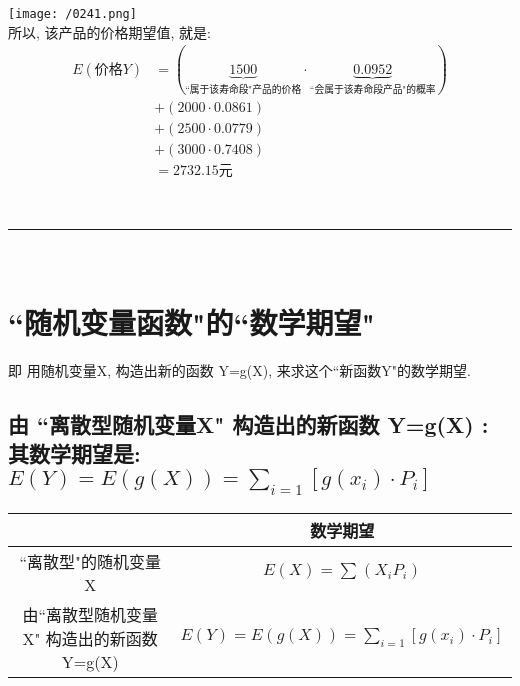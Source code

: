 \documentclass[UTF8]{ctexart}
\begin{document}
\begin{myEnvSample}
\texttt{[image: /0241.png]} \\

所以, 该产品的价格期望值, 就是: \\
\begin{align*}  %
	E(\text{价格}Y) & =\left( \underset{\text{``属于该寿命段"产品的价格}}{\underbrace{1500}}\cdot \underset{\text{``会属于该寿命段产品"的概率}}{\underbrace{0.0952}} \right)\\
& +\left( 2000\cdot 0.0861 \right)\\
& +\left( 2500\cdot 0.0779 \right)\\
& +\left( 3000\cdot 0.7408 \right)\\
& =2732.15 \text{元}
\end{align*}
\end{myEnvSample}
	
	
	
	~\\
	\hrule
	~\\
	
	
\section{``随机变量函数"的``数学期望"}	
即 用随机变量X, 构造出新的函数 Y=g(X), 来求这个``新函数Y"的数学期望. \\

\subsection{由 ``离散型随机变量X" 构造出的新函数 Y=g(X) : 其数学期望是: \\ $E(Y)=E(g(X))=\sum_{i=1}^{}{\left[ g(x_i)\cdot P_i \right]}$ }

\begin{tabular}{|c|c|}
	\hline
	& 数学期望 \\
	\hline
	``离散型"的随机变量 X & $E(X)=\sum_{}^{}{(X_iP_i)}$ \\
	\hline
	由``离散型随机变量X" 构造出的新函数 Y=g(X) &  $E(Y)=E(g(X))=\sum_{i=1}^{}{\left[ g(x_i)\cdot P_i \right]}$
	\\
	\hline
\end{tabular} \\
\vspace{1em} 
\end{document}
